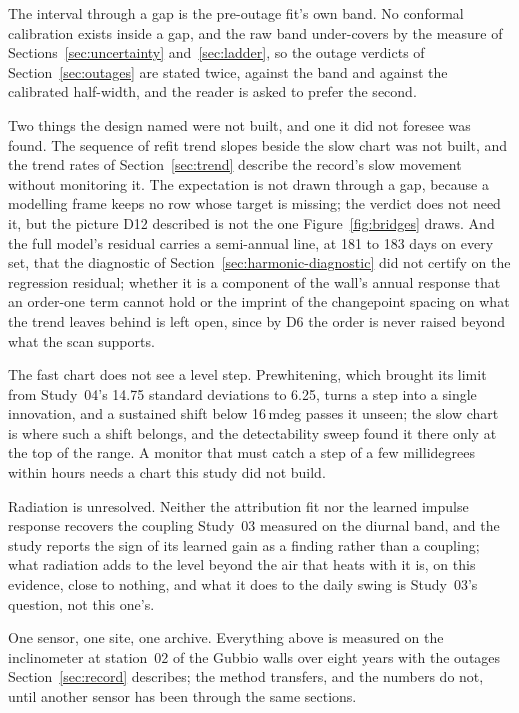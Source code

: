 \documentclass[11pt,a4paper]{article}
\begin{document}
The interval through a gap is the pre-outage fit's own band. No conformal
calibration exists inside a gap, and the raw band under-covers by the
measure of Sections~\ref{sec:uncertainty} and~\ref{sec:ladder}, so the
outage verdicts of Section~\ref{sec:outages} are stated twice, against the
band and against the calibrated half-width, and the reader is asked to
prefer the second.

Two things the design named were not built, and one it did not foresee was
found. The sequence of refit trend slopes beside the slow chart was not
built, and the trend rates of Section~\ref{sec:trend} describe the record's
slow movement without monitoring it. The expectation is not drawn through a
gap, because a modelling frame keeps no row whose target is missing; the
verdict does not need it, but the picture D12 described is not the one
Figure~\ref{fig:bridges} draws. And the full model's residual carries a
semi-annual line, at 181 to 183 days on every set, that the diagnostic of
Section~\ref{sec:harmonic-diagnostic} did not certify on the regression
residual; whether it is a component of the wall's annual response that an
order-one term cannot hold or the imprint of the changepoint spacing on
what the trend leaves behind is left open, since by D6 the order is never
raised beyond what the scan supports.

The fast chart does not see a level step. Prewhitening, which brought its
limit from Study~04's 14.75 standard deviations to 6.25, turns a step into a
single innovation, and a sustained shift below 16\,mdeg passes it unseen;
the slow chart is where such a shift belongs, and the detectability sweep
found it there only at the top of the range. A monitor that must catch a
step of a few millidegrees within hours needs a chart this study did not
build.

Radiation is unresolved. Neither the attribution fit nor the learned impulse
response recovers the coupling Study~03 measured on the diurnal band, and
the study reports the sign of its learned gain as a finding rather than a
coupling; what radiation adds to the level beyond the air that heats with it
is, on this evidence, close to nothing, and what it does to the daily swing
is Study~03's question, not this one's.

One sensor, one site, one archive. Everything above is measured on the
inclinometer at station~02 of the Gubbio walls over eight years with the
outages Section~\ref{sec:record} describes; the method transfers, and the
numbers do not, until another sensor has been through the same sections.
\end{document}
